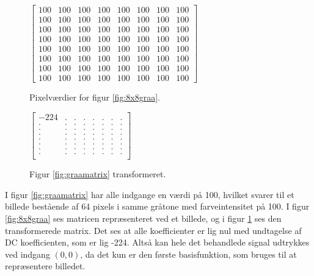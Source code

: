 \begin{figure}[htbp]
\begin{minipage}[b]{0.45\linewidth}
\centering
$\begin{bmatrix}
100	&	100	&	100	&	100	&	100	&	100	&	100	&	100\\
100	&	100	&	100	&	100	&	100	&	100	&	100	&	100\\
100	&	100	&	100	&	100	&	100	&	100	&	100	&	100\\
100	&	100	&	100	&	100	&	100	&	100	&	100	&	100\\
100	&	100	&	100	&	100	&	100	&	100	&	100	&	100\\
100	&	100	&	100	&	100	&	100	&	100	&	100	&	100\\
100	&	100	&	100	&	100	&	100	&	100	&	100	&	100\\
100	&	100	&	100	&	100	&	100	&	100	&	100	&	100
\end{bmatrix}$
\caption{Pixelværdier for figur \ref{fig:8x8graa}.\label{fig:graamatrix}}
\end{minipage}
\hspace{1.0cm}
\begin{minipage}[b]{0.45\linewidth}
\centering
$\begin{bmatrix}
-224		&	.	&	.	&	.	&	.	&	.	&	.	&	.\\
.		&	.	&	.	&	.	&	.	&	.	&	.	&	.\\
.		&	.	&	.	&	.	&	.	&	.	&	.	&	.\\
.		&	.	&	.	&	.	&	.	&	.	&	.	&	.\\
.		&	.	&	.	&	.	&	.	&	.	&	.	&	.\\
.		&	.	&	.	&	.	&	.	&	.	&	.	&	.\\
.		&	.	&	.	&	.	&	.	&	.	&	.	&	.\\
.		&	.	&	.	&	.	&	.	&	.	&	.	&	.\\
\end{bmatrix}
$
\caption{Figur \ref{fig:graamatrix} transformeret.\label{fig:trans_matrix1}}
\end{minipage}
\end{figure}
I figur \ref{fig:graamatrix} har alle indgange en værdi på 100, hvilket svarer til et billede bestående af 64 pixels i samme gråtone med farveintensitet på 100. I figur \ref{fig:8x8graa} ses matricen repræsenteret ved et billede, og i figur \ref{fig:trans_matrix1} ses den transformerede matrix. Det ses at alle koefficienter er lig nul med undtagelse af DC koefficienten, som er lig -224. Altså kan hele det behandlede signal udtrykkes ved indgang $(0, 0)$, da det kun er den første basisfunktion, som bruges til at repræsentere billedet.

